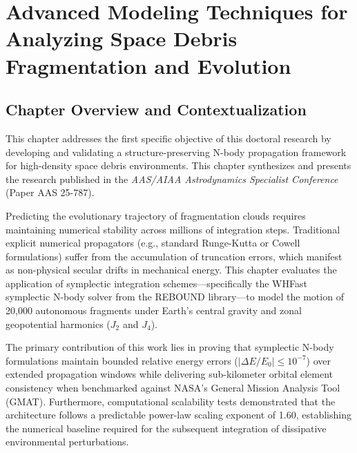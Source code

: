 \documentclass[12pt,letterpaper,twoside]{book}
\begin{document}
\cleardoublepage

\chapter{Advanced Modeling Techniques for Analyzing Space Debris Fragmentation and Evolution}
\label{ch:paper1}

\section*{Chapter Overview and Contextualization}
This chapter addresses the first specific objective of this doctoral research by developing and validating a structure-preserving N-body propagation framework for high-density space debris environments. This chapter synthesizes and presents the research published in the \textit{AAS/AIAA Astrodynamics Specialist Conference} (Paper AAS 25-787).

Predicting the evolutionary trajectory of fragmentation clouds requires maintaining numerical stability across millions of integration steps. Traditional explicit numerical propagators (e.g., standard Runge-Kutta or Cowell formulations) suffer from the accumulation of truncation errors, which manifest as non-physical secular drifts in mechanical energy. This chapter evaluates the application of symplectic integration schemes---specifically the WHFast symplectic N-body solver from the REBOUND library---to model the motion of 20,000 autonomous fragments under Earth's central gravity and zonal geopotential harmonics ($J_2$ and $J_4$).

The primary contribution of this work lies in proving that symplectic N-body formulations maintain bounded relative energy errors ($|\Delta E/E_0| \le 10^{-7}$) over extended propagation windows while delivering sub-kilometer orbital element consistency when benchmarked against NASA's General Mission Analysis Tool (GMAT). Furthermore, computational scalability tests demonstrated that the architecture follows a predictable power-law scaling exponent of 1.60, establishing the numerical baseline required for the subsequent integration of dissipative environmental perturbations.

\newpage
% 
\end{document}
